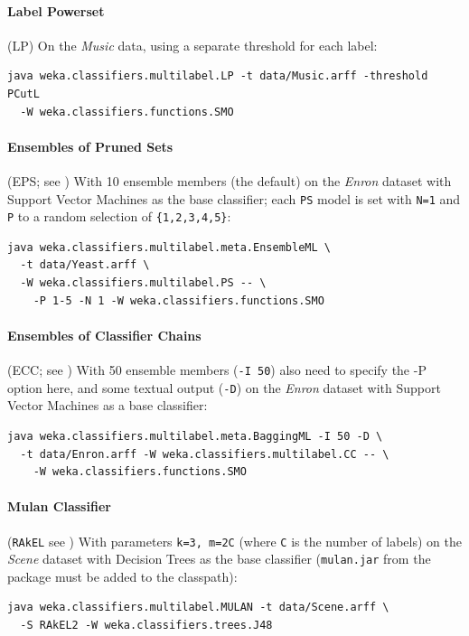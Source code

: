 \documentclass[11pt]{article}
\newcommand{\MULAN}{Mulan}
\begin{document}
\paragraph{Label Powerset} (LP) On the \textit{Music} data, using a separate threshold for each label: 
\begin{verbatim}
java weka.classifiers.multilabel.LP -t data/Music.arff -threshold PCutL
  -W weka.classifiers.functions.SMO
\end{verbatim}

\paragraph{Ensembles of Pruned Sets} (EPS; see \cite{EPS}) With 10 ensemble members (the default) on the \textit{Enron} dataset with Support Vector Machines as the base classifier; each \texttt{PS} model is set with \texttt{N=1} and \texttt{P} to a random selection of \texttt{\{1,2,3,4,5\}}:

\begin{verbatim}
java weka.classifiers.multilabel.meta.EnsembleML \
  -t data/Yeast.arff \
  -W weka.classifiers.multilabel.PS -- \
    -P 1-5 -N 1 -W weka.classifiers.functions.SMO
\end{verbatim}

\paragraph{Ensembles of Classifier Chains} (ECC; see \cite{ECC2}) With 50 ensemble members (\texttt{-I 50}) {\blue also need to specify the -P option here}, and some textual output (\texttt{-D}) on the \textit{Enron} dataset with Support Vector Machines as a base classifier:
\begin{verbatim}
java weka.classifiers.multilabel.meta.BaggingML -I 50 -D \
  -t data/Enron.arff -W weka.classifiers.multilabel.CC -- \
    -W weka.classifiers.functions.SMO
\end{verbatim}

\paragraph{Mulan Classifier} (\texttt{RAkEL} see \cite{RAKEL}) With parameters \texttt{\texttt{k=3}, \texttt{m=2C}} (where \texttt{C} is the number of labels) on the \textit{Scene} dataset with Decision Trees as the base classifier ({\texttt{mulan.jar} from the \framework{\MULAN} package must be added to the classpath}):
\begin{verbatim}
java weka.classifiers.multilabel.MULAN -t data/Scene.arff \ 
  -S RAkEL2 -W weka.classifiers.trees.J48
\end{verbatim}
\end{document}
